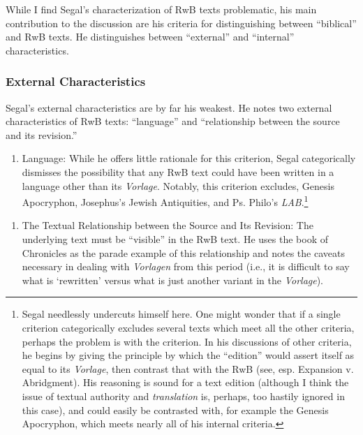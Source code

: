 While I find Segal's characterization of RwB texts problematic, his main
contribution to the discussion are his criteria for distinguishing
between ``biblical'' and RwB texts. He distinguishes between
``external'' and ``internal'' characteristics.

\subsubsection{External Characteristics}\label{external-characteristics}

Segal's external characteristics are by far his weakest. He notes two
external characteristics of RwB texts: ``language'' and ``relationship
between the source and its revision.''

\begin{enumerate}
\def\labelenumi{\arabic{enumi}.}
\tightlist
\item
  Language: While he offers little rationale for this criterion, Segal
  categorically dismisses the possibility that any RwB text could have
  been written in a language other than its \emph{Vorlage}. Notably,
  this criterion excludes, Genesis Apocryphon, Josephus's
  Jewish Antiquities, and Ps. Philo's \emph{LAB}.\footnote{Segal
    needlessly undercuts himself here. One might wonder that if a single
    criterion categorically excludes several texts which meet all the
    other criteria, perhaps the problem is with the criterion. In his
    discussions of other criteria, he begins by giving the principle by
    which the ``edition'' would assert itself as equal to its
    \emph{Vorlage}, then contrast that with the RwB (see, esp. Expansion
    v. Abridgment). His reasoning is sound for a text edition (although
    I think the issue of textual authority and \emph{translation} is,
    perhaps, too hastily ignored in this case), and could easily be
    contrasted with, for example the Genesis Apocryphon, which meets
    nearly all of his internal criteria.}
\end{enumerate}

\begin{enumerate}
\def\labelenumi{\arabic{enumi}.}
\setcounter{enumi}{1}
\tightlist
\item
  The Textual Relationship between the Source and Its Revision: The
  underlying text must be ``visible'' in the RwB text. He uses the book
  of Chronicles as the parade example of this relationship and notes the
  caveats necessary in dealing with \emph{Vorlagen} from this period
  (i.e., it is difficult to say what is `rewritten' versus what is just
  another variant in the \emph{Vorlage}).
\end{enumerate}

